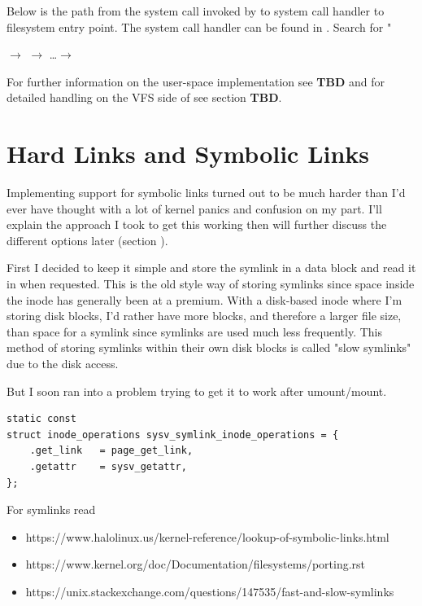 \noindent
Below is the path from the  system call invoked by  to system call handler to filesystem entry point. The  system call handler can be found in . Search for "

\small
\bigskip
{} $\rightarrow$   $\rightarrow$ \ldots $\rightarrow$ 

\bigskip
\normalsize
\noindent
For further information on the user-space implementation see \textbf{TBD} and for detailed handling on the VFS side of  see section \textbf{TBD}.


\section{Hard Links and Symbolic Links}\label{diskfs-links}

Implementing support for symbolic links turned out to be much harder than I'd ever have thought with a lot of kernel panics and confusion on my part. I'll explain the approach I took to get this working then will further discuss the different options later (section ).

First I decided to keep it simple and store the symlink in a data block and read it in when requested. This is the old style way of storing symlinks since space inside the inode has generally been at a premium. With a disk-based inode where I'm storing disk blocks, I'd rather have more blocks, and therefore a larger file size, than space for a symlink since symlinks are used much less frequently. This method of storing symlinks within their own disk blocks is called "slow symlinks" due to the disk access.

But I soon ran into a problem trying to get it to work after umount/mount.

\begin{lstlisting}
static const 
struct inode_operations sysv_symlink_inode_operations = {
	.get_link   = page_get_link,
	.getattr    = sysv_getattr,
};
\end{lstlisting}

\noindent
For symlinks read 

\begin{itemize}
	\item https://www.halolinux.us/kernel-reference/lookup-of-symbolic-links.html 
	\item https://www.kernel.org/doc/Documentation/filesystems/porting.rst
	\item https://unix.stackexchange.com/questions/147535/fast-and-slow-symlinks
\end{itemize}

